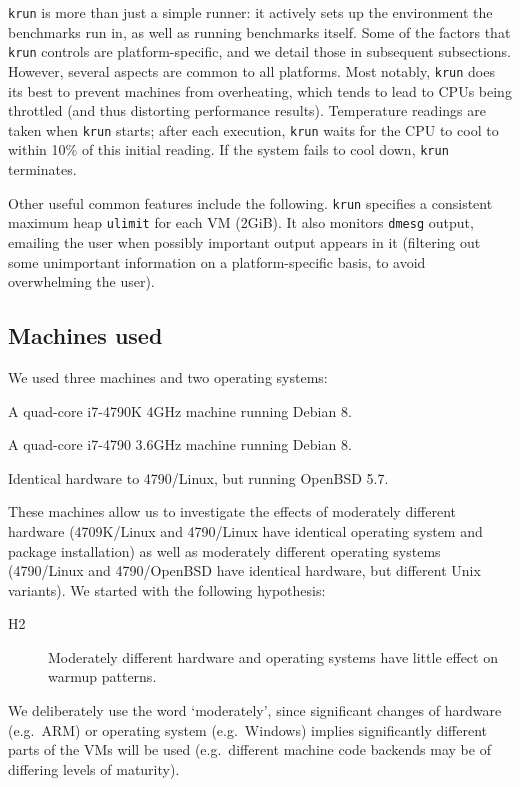 \documentclass[10pt,preprint]{sigplanconf}
\newcommand{\krun}{\texttt{krun}\xspace}
\newcommand{\hyptwo}{H2\xspace}
\newcommand{\bencherthree}{4709K/Linux\xspace}
\newcommand{\bencherfive}{4790/Linux\xspace}
\newcommand{\benchersix}{4790/OpenBSD\xspace}
\begin{document}
\krun is more than just a simple runner: it actively sets up the environment the
benchmarks run in, as well as running benchmarks itself. Some of the factors
that \krun controls are platform-specific, and we detail
those in subsequent subsections. However, several aspects are common to all
platforms. Most notably, \krun does its best to prevent machines from
overheating, which tends to lead to CPUs being throttled (and thus distorting
performance results). Temperature readings are taken when \krun starts; after
each execution, \krun waits for the CPU to cool to within 10\%{} of this initial
reading. If the system fails to cool down, \krun terminates.  

Other useful common features include the following. \krun specifies a consistent maximum heap
\texttt{ulimit} for each VM (2GiB). It also monitors \texttt{dmesg} output,
emailing the user when possibly important output appears in it (filtering out
some unimportant information on a platform-specific basis, to avoid overwhelming
the user). 


\subsection{Machines used}

We used three machines and two operating systems:
\begin{description*}
  \item[\bencherthree] A quad-core i7-4790K 4GHz machine running Debian 8.
  \item[\bencherfive] A quad-core i7-4790 3.6GHz machine running Debian 8.
  \item[\benchersix] Identical hardware to \bencherfive, but running OpenBSD 5.7.
\end{description*}
These machines allow us to investigate the effects of moderately different
hardware (\bencherthree and \bencherfive have identical operating system and
package installation) as well as moderately different operating systems
(\bencherfive and \benchersix have identical hardware, but different Unix
variants). We started with the following hypothesis:
\begin{description}
  \item[\hyptwo] Moderately different hardware and operating systems have little effect on warmup patterns.
\end{description}
We deliberately use the word `moderately', since significant changes of hardware
(e.g.~ARM) or operating system (e.g.~Windows) implies significantly different
parts of the VMs will be used (e.g.~different machine code backends may be of
differing levels of maturity).
\end{document}
